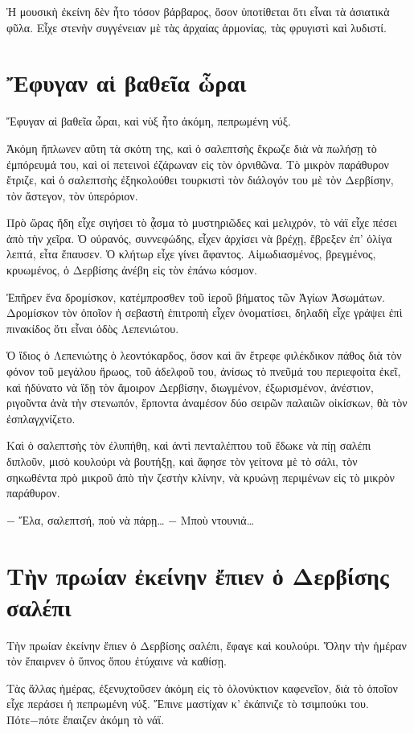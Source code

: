 \documentclass[11pt]{article}
\begin{document}
Ἡ μουσικὴ ἐκείνη δὲν ἦτο τόσον βάρβαρος, ὅσον ὑποτίθεται ὅτι εἶναι τὰ ἀσιατικὰ φῦλα. Εἶχε στενὴν συγγένειαν μὲ τὰς ἀρχαίας ἁρμονίας, τὰς φρυγιστὶ καὶ λυδιστί.

\section{Ἔφυγαν αἱ βαθεῖα ὧραι}
\label{sec:org4b155fb}
Ἔφυγαν αἱ βαθεῖα ὧραι, καὶ νὺξ ἦτο ἀκόμη, πεπρωμένη νύξ.

Ἀκόμη ἥπλωνεν αὕτη τὰ σκότη της, καὶ ὁ σαλεπτσὴς ἔκρωζε διὰ νὰ πωλήσῃ τὸ ἐμπόρευμά του, καὶ οἱ πετεινοὶ ἐζάρωναν εἰς τὸν ὀρνιθῶνα. Τὸ μικρὸν παράθυρον ἔτριζε, καὶ ὁ σαλεπτσὴς ἐξηκολούθει τουρκιστὶ τὸν διάλογόν του μὲ τὸν Δερβίσην, τὸν ἄστεγον, τὸν ὑπερόριον.

Πρὸ ὥρας ἤδη εἶχε σιγήσει τὸ ᾆσμα τὸ μυστηριῶδες καὶ μελιχρόν, τὸ νάϊ εἶχε πέσει ἀπὸ τὴν χεῖρα. Ὁ οὐρανός, συννεφώδης, εἶχεν ἀρχίσει νὰ βρέχῃ, ἔβρεξεν ἐπ' ὀλίγα λεπτά, εἶτα ἔπαυσεν. Ὁ κλήτωρ εἶχε γίνει ἄφαντος. Αἱμωδιασμένος, βρεγμένος, κρυωμένος, ὁ Δερβίσης ἀνέβη εἰς τὸν ἐπάνω κόσμον.

Ἐπῆρεν ἕνα δρομίσκον, κατέμπροσθεν τοῦ ἱεροῦ βήματος τῶν Ἁγίων Ἀσωμάτων. Δρομίσκον τὸν ὁποῖον ἡ σεβαστὴ ἐπιτροπὴ εἶχεν ὀνοματίσει, δηλαδὴ εἶχε γράψει ἐπὶ πινακίδος ὅτι εἶναι ὁδὸς Λεπενιώτου.

Ὁ ἴδιος ὁ Λεπενιώτης ὁ λεοντόκαρδος, ὅσον καὶ ἂν ἔτρεφε φιλέκδικον πάθος διὰ τὸν φόνον τοῦ μεγάλου ἥρωος, τοῦ ἀδελφοῦ του, ἀνίσως τὸ πνεῦμά του περιεφοίτα ἐκεῖ, καὶ ἠδύνατο νὰ ἴδῃ τὸν ἄμοιρον Δερβίσην, διωγμένον, ἐξωρισμένον, ἀνέστιον, ριγοῦντα ἀνὰ τὴν στενωπόν, ἕρποντα ἀναμέσον δύο σειρῶν παλαιῶν οἰκίσκων, θὰ τὸν ἐσπλαγχνίζετο.

Καὶ ὁ σαλεπτσὴς τὸν ἐλυπήθη, καὶ ἀντὶ πενταλέπτου τοῦ ἔδωκε νὰ πίῃ σαλέπι διπλοῦν, μισὸ κουλούρι νὰ βουτήξῃ, καὶ ἄφησε τὸν γείτονα μὲ τὸ σάλι, τὸν σηκωθέντα πρὸ μικροῦ ἀπὸ τὴν ζεστὴν κλίνην, νὰ κρυώνῃ περιμένων εἰς τὸ μικρὸν παράθυρον.

− Ἔλα, σαλεπτσή, ποὺ νὰ πάρῃ…
− Μποὺ ντουνιά…

\section{Τὴν πρωίαν ἐκείνην ἔπιεν ὁ Δερβίσης σαλέπι}
\label{sec:orga80095b}
Τὴν πρωίαν ἐκείνην ἔπιεν ὁ Δερβίσης σαλέπι, ἔφαγε καὶ κουλούρι. Ὅλην τὴν ἡμέραν τὸν ἔπαιρνεν ὁ ὕπνος ὅπου ἐτύχαινε νὰ καθίσῃ.

Τὰς ἄλλας ἡμέρας, ἐξενυχτοῦσεν ἀκόμη εἰς τὸ ὁλονύκτιον καφενεῖον, διὰ τὸ ὁποῖον εἶχε περάσει ἡ πεπρωμένη νύξ. Ἔπινε μαστίχαν κ' ἐκάπνιζε τὸ τσιμπούκι του. Πότε−πότε ἔπαιζεν ἀκόμη τὸ νάϊ.
\end{document}
